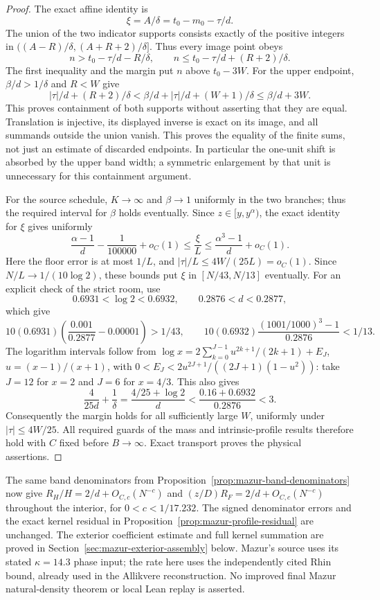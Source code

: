 \documentclass[11pt]{article}
\theoremstyle{remark}\newtheorem{remark}[proposition]{Remark}
\begin{document}
\begin{proof}
The exact affine identity is
\[
 \xi=A/\delta=t_0-m_0-\tau/d.
\]
The union of the two indicator supports consists exactly of the
positive integers in
$((A-R)/\delta,(A+R+2)/\delta]$. Thus every image point obeys
\[
 n>t_0-\tau/d-R/\delta,\qquad
 n\le t_0-\tau/d+(R+2)/\delta.
\]
The first inequality and the margin put $n$ above $t_0-3W$.
For the upper endpoint, $\beta/d>1/\delta$ and $R<W$ give
\[
 |\tau|/d+(R+2)/\delta
 <\beta/d+|\tau|/d+(W+1)/\delta
 \le\beta/d+3W.
\]
This proves containment of both supports without asserting that they
are equal. Translation is injective, its displayed inverse is exact
on its image, and all summands outside the union vanish.
This proves the equality of the finite sums, not just an estimate
of discarded endpoints. In particular the one-unit shift is absorbed
by the upper band width; a symmetric enlargement by that unit is
unnecessary for this containment argument.

For the source schedule, $K\to\infty$ and $\beta\to1$ uniformly in
the two branches; thus the required interval for $\beta$ holds
eventually. Since $z\in[y,y^\alpha)$, the exact identity for $\xi$
gives uniformly
\[
 \frac{\alpha-1}{d}-\frac1{100000}+o_C(1)
 \le\frac{\xi}{L}
 \le\frac{\alpha^3-1}{d}+o_C(1).
\]
Here the floor error is at most $1/L$, and
$|\tau|/L\le4W/(25L)=o_C(1)$. Since $N/L\to1/(10\log2)$,
these bounds put $\xi$ in $[N/43,N/13]$ eventually. For an explicit
check of the strict room, use
\[
 0.6931<\log2<0.6932,\qquad
 0.2876<d<0.2877,
\]
which give
\[
 10(0.6931)\left(\frac{0.001}{0.2877}-0.00001\right)>1/43,
 \qquad
 10(0.6932)\frac{(1001/1000)^3-1}{0.2876}<1/13.
\]
The logarithm intervals follow from
$\log x=2\sum_{k=0}^{J-1}u^{2k+1}/(2k+1)+E_J$,
$u=(x-1)/(x+1)$, with
$0<E_J<2u^{2J+1}/((2J+1)(1-u^2))$:
take $J=12$ for $x=2$ and $J=6$ for $x=4/3$.
This also gives
\[
 \frac{4}{25d}+\frac1\delta
 =\frac{4/25+\log2}{d}
 <\frac{0.16+0.6932}{0.2876}<3.
\]
Consequently the margin holds for all sufficiently large $W$,
uniformly under $|\tau|\le4W/25$. All required guards of the mass
and intrinsic-profile results therefore hold with $C$ fixed before
$B\to\infty$. Exact transport proves the physical assertions.
\end{proof}

The same band denominators from
Proposition~\ref{prop:mazur-band-denominators} now give
$R_H/H=2/d+O_{C,c}(N^{-c})$ and
$(z/D)R_F=2/d+O_{C,c}(N^{-c})$ throughout the interior,
for $0<c<1/17.232$. The signed denominator errors and the exact
kernel residual in Proposition~\ref{prop:mazur-profile-residual}
are unchanged. The exterior coefficient estimate and full kernel
summation are proved in Section~\ref{sec:mazur-exterior-assembly} below.
Mazur's source uses its stated $\kappa=14.3$
phase input; the rate here uses the independently cited Rhin bound,
already used in the Allikvere reconstruction. No improved final
Mazur natural-density theorem or local Lean replay is asserted.
\end{document}
